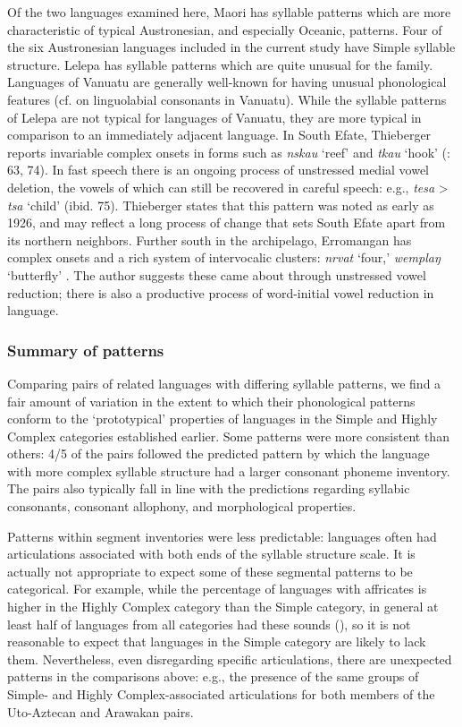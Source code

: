   Of the two languages examined here, Maori has syllable patterns which are more characteristic of typical Austronesian, and especially Oceanic, patterns. Four of the six Austronesian languages included in the current study have Simple syllable structure. Lelepa has syllable patterns which are quite unusual for the family. Languages of Vanuatu are generally well-known for having unusual phonological features (cf. \citealt{Maddieson1989b} on linguolabial consonants in Vanuatu). While the syllable patterns of Lelepa are not typical for languages of Vanuatu, they are more typical in comparison to an immediately adjacent language. In South Efate, Thieberger reports invariable complex onsets in forms such as \textit{nskau} ‘reef’ and \textit{tkau} ‘hook’ (\citealt{Thieberger2004}: 63, 74). In fast speech there is an ongoing process of unstressed medial vowel deletion, the vowels of which can still be recovered in careful speech: e.g., \textit{tesa} > \textit{tsa} ‘child’ (ibid. 75). Thieberger states that this pattern was noted as early as 1926, and may reflect a long process of change that sets South Efate apart from its northern neighbors. Further south in the archipelago, Erromangan has complex onsets and a rich system of intervocalic clusters: \textit{nrvat} ‘four,’ \textit{wemplaŋ} ‘butterfly’ \citep[20-2]{Crowley1998}. The author suggests these came about through unstressed vowel reduction; there is also a productive process of word-initial vowel reduction in language.

\subsubsection{{Summary} {of} {patterns}}\label{sec:8.4.3.7}

  Comparing pairs of related languages with differing syllable patterns, we find a fair amount of variation in the extent to which their phonological patterns conform to the ‘prototypical’ properties of languages in the Simple and Highly Complex categories established earlier. Some patterns were more consistent than others: 4/5 of the pairs followed the predicted pattern by which the language with more complex syllable structure had a larger consonant phoneme inventory. The pairs also typically fall in line with the predictions regarding syllabic consonants, consonant allophony, and morphological properties.

  Patterns within segment inventories were less predictable: languages often had articulations associated with both ends of the syllable structure scale. It is actually not appropriate to expect some of these segmental patterns to be categorical. For example, while the percentage of languages with affricates is higher in the Highly Complex category than the Simple category, in general at least half of languages from all categories had these sounds (), so it is not reasonable to expect that languages in the Simple category are likely to lack them. Nevertheless, even disregarding specific articulations, there are unexpected patterns in the comparisons above: e.g., the presence of the same groups of Simple- and Highly Complex-associated articulations for both members of the Uto-Aztecan and Arawakan pairs.

